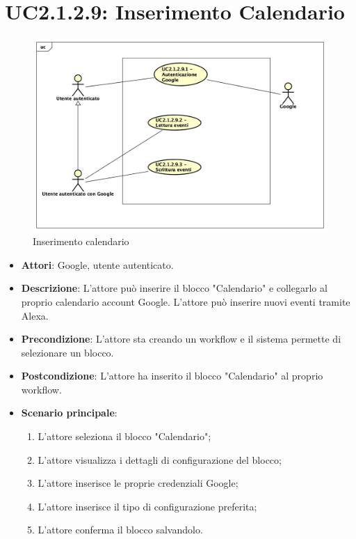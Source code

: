\section{UC2.1.2.9: Inserimento Calendario}
\label{UC2.1.2.9}
\begin{figure}[h]
	\centering
	\includegraphics[scale=0.4]{Diagram/Calendario.png}
	\caption{Inserimento calendario}\label{}
\end{figure}
\begin{itemize}
	\item \textbf{Attori}: Google, utente autenticato.
	\item \textbf{Descrizione}: L'attore può inserire il blocco "Calendario" e collegarlo al proprio calendario account Google. L'attore può inserire nuovi eventi tramite Alexa.
	\item \textbf{Precondizione}: L'attore sta creando un workflow e il sistema permette di selezionare un blocco.
	\item \textbf{Postcondizione}: L'attore ha inserito il blocco "Calendario" al proprio workflow.
	\item \textbf{Scenario principale}:
	\begin{enumerate} \item L'attore seleziona il blocco "Calendario"; \item L'attore visualizza i dettagli di configurazione del blocco; \item  L'attore inserisce le proprie credenziali Google; \item L'attore inserisce il tipo di configurazione preferita; \item L'attore conferma il blocco salvandolo.\end{enumerate}
\end{itemize}


